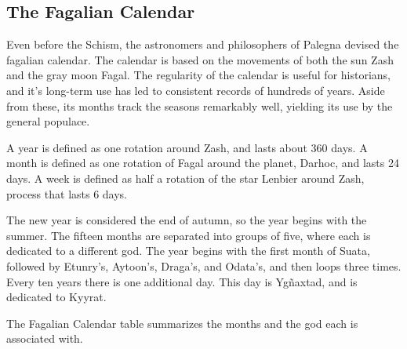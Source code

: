 
\subsection*{The Fagalian Calendar}
Even before the Schism, the astronomers and philosophers of Palegna devised the fagalian calendar.
The calendar is based on the movements of both the sun Zash and the gray moon Fagal.
The regularity of the calendar is useful for historians, and it's long-term use has led to consistent records of hundreds of years.
Aside from these, its months track the seasons remarkably well, yielding its use by the general populace.

A year is defined as one rotation around Zash, and lasts about 360 days.
A month is defined as one rotation of Fagal around the planet, Darhoc, and lasts 24 days.
A week is defined as half a rotation of the star Lenbier around Zash, process that lasts 6 days.

The new year is considered the end of autumn, so the year begins with the summer.
The fifteen months are separated into groups of five, where each is dedicated to a different god.
The year begins with the first month of Suata, followed by Etunry's, Aytoon's, Draga's, and Odata's, and then loops three times.
Every ten years there is one additional day.
This day is Yg\~naxtad, and is dedicated to Kyyrat.

The Fagalian Calendar table summarizes the months and the god each is associated with.

